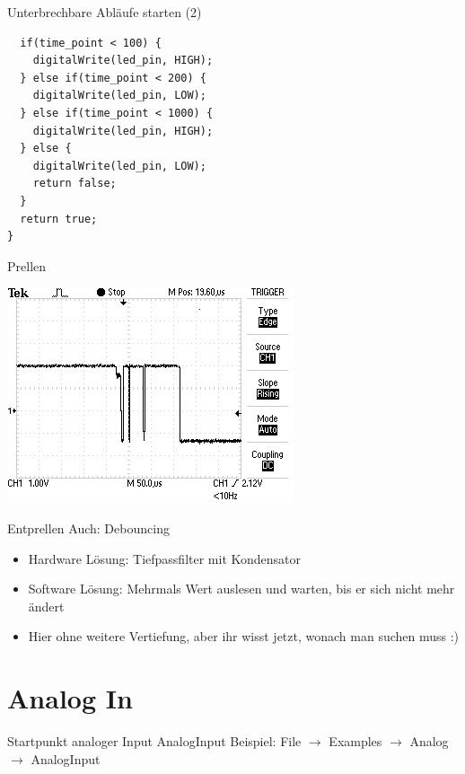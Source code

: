 \documentclass[bigger]{beamer}
\begin{document}
\begin{frame}[fragile,label={sec:orgf005fa0}]{Unterbrechbare Abläufe starten (2)}
 \begin{verbatim}
  if(time_point < 100) {
    digitalWrite(led_pin, HIGH);
  } else if(time_point < 200) {
    digitalWrite(led_pin, LOW);
  } else if(time_point < 1000) {
    digitalWrite(led_pin, HIGH);
  } else {
    digitalWrite(led_pin, LOW);
    return false;
  }
  return true;
}
\end{verbatim}
\end{frame}

\begin{frame}[label={sec:org2ecbfda}]{Prellen}
\begin{center}
\includegraphics[width=.9\linewidth]{./img/bounce.png}
\end{center}
\end{frame}

\begin{frame}[label={sec:org8f4066b}]{Entprellen}
Auch: Debouncing

\begin{itemize}
\item Hardware Lösung: Tiefpassfilter mit Kondensator
\item Software Lösung: Mehrmals Wert auslesen und warten, bis er sich
nicht mehr ändert
\item Hier ohne weitere Vertiefung, aber ihr wisst jetzt, wonach man
suchen muss :)
\end{itemize}
\end{frame}

\section{Analog In}
\label{sec:orgf1c80d0}
\begin{frame}[label={sec:org3c58f78}]{Startpunkt analoger Input}
AnalogInput Beispiel: File \(\rightarrow\) Examples \(\rightarrow\) Analog
\(\rightarrow\) AnalogInput
\end{frame}
\end{document}

